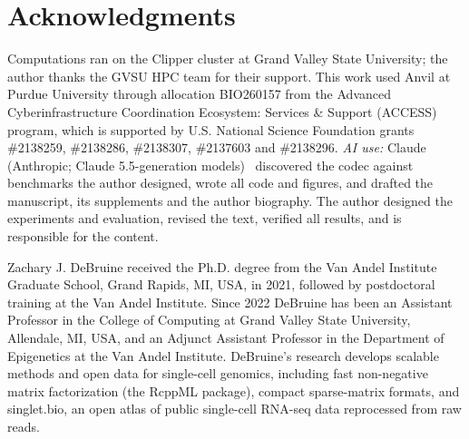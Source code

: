 \documentclass[10pt,journal,compsoc]{IEEEtran}
\begin{document}
\section*{Acknowledgments}
Computations ran on the Clipper cluster at Grand Valley State University; the author thanks the GVSU HPC team for their
support. This work used Anvil at Purdue University through allocation BIO260157 from the Advanced Cyberinfrastructure
Coordination Ecosystem: Services \& Support (ACCESS) program, which is supported by U.S. National Science Foundation
grants \#2138259, \#2138286, \#2138307, \#2137603 and \#2138296. \emph{AI use:} Claude (Anthropic; Claude 5.5-generation models)~\cite{anthropicclaude} discovered the codec against benchmarks the author
designed, wrote all code and figures, and drafted the manuscript, its supplements and the author biography. The author designed the experiments
and evaluation, revised the text, verified all results, and is responsible for the content.




\begin{IEEEbiographynophoto}{Zachary J. DeBruine}
received the Ph.D. degree from the Van Andel Institute Graduate School, Grand Rapids, MI, USA, in 2021, followed by
postdoctoral training at the Van Andel Institute. Since 2022 DeBruine has been an Assistant Professor in the College of
Computing at Grand Valley State University, Allendale, MI, USA, and an Adjunct Assistant Professor in the Department of
Epigenetics at the Van Andel Institute. DeBruine's research develops scalable methods and open data for single-cell
genomics, including fast non-negative matrix factorization (the RcppML package), compact sparse-matrix formats, and
singlet.bio, an open atlas of public single-cell RNA-seq data reprocessed from raw reads.
\end{IEEEbiographynophoto}
\end{document}
